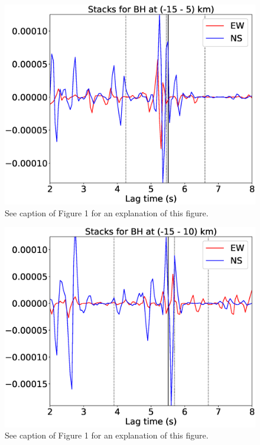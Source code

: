 \documentclass[letterpaper, 12pt]{article}
\begin{document}
\begin{figure}[H]
\includegraphics[width=\linewidth]{figures/intervals/BH_-15_005_stacks.eps}
\caption{See caption of Figure 1 for an explanation of this figure.}
\end{figure}

\begin{figure}[H]
\includegraphics[width=\linewidth]{figures/intervals/BH_-15_010_stacks.eps}
\caption{See caption of Figure 1 for an explanation of this figure.}
\end{figure}
\end{document}
